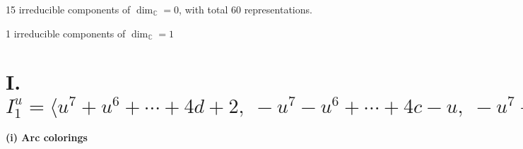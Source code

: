 \documentclass[1p]{elsarticle_modified}
\theoremstyle{definition}
\begin{document}
\raggedright * 15 irreducible components of $\dim_{\mathbb{C}}=0$, with total 60 representations.\\
\raggedright * 1 irreducible components of $\dim_{\mathbb{C}}=1$ \\
\newpage
\renewcommand{\arraystretch}{1}
\centering \section*{I. $I^u_{1}= \langle u^7+u^6+\cdots+4 d+2,\;- u^7- u^6+\cdots+4 c- u,\;- u^7+u^6+\cdots+4 b+2,\;u^7- u^6+\cdots+4 a- u,\;u^8+5 u^6+\cdots- u+2 \rangle$}
\flushleft \textbf{(i) Arc colorings}\\
\end{document}
